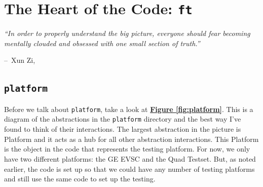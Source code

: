 \documentclass{report}
\makeatletter
\newenvironment{chapquote}[2][2em]
  {\setlength{\@tempdima}{#1}%
   \def\chapquote@author{#2}%
   \parshape 1 \@tempdima \dimexpr\textwidth-2\@tempdima\relax%
   \itshape}
  {\par\normalfont\hfill--\ \chapquote@author\hspace*{\@tempdima}\par\bigskip}
\makeatother
\begin{document}
	\begin{minipage}{\linewidth}
		\label{fig:lib/ui}
	\end{minipage}

\chapter{The Heart of the Code: \texttt{ft}}
\begin{chapquote}{Xun Zi, \textit{}}
``In order to properly understand the big picture, everyone should fear becoming mentally clouded and obsessed with one small section of truth.''
\end{chapquote}


\section{\texttt{platform}}
Before we talk about \texttt{platform}, take a look at \hyperref[fig:platform]{\textbf{Figure \ref{fig:platform}}}. This is a diagram of the abstractions in the \texttt{platform} directory and the best way I've found to think of their interactions. The largest abstraction in the picture is Platform and it acts as a hub for all other abstraction interactions. This Platform is the object in the code that represents the testing platform. For now, we only have two different platforms: the GE EVSC and the Quad Testset. But, as noted earlier, the code is set up so that we could have any number of testing platforms and still use the same code to set up the testing. 
\end{document}
